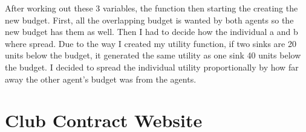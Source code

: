 After working out these 3 variables, the function then starting the creating the new budget. First, all the overlapping budget is wanted by both agents so the new budget has them as well. Then I had to decide how the individual a and b where spread. Due to the way I created my utility function, if two sinks are 20 units below the budget, it generated the same utility as one sink 40 units below the budget. I decided to spread the individual utility proportionally by how far away the other agent’s budget was from the agents. 
\section{Club Contract Website}